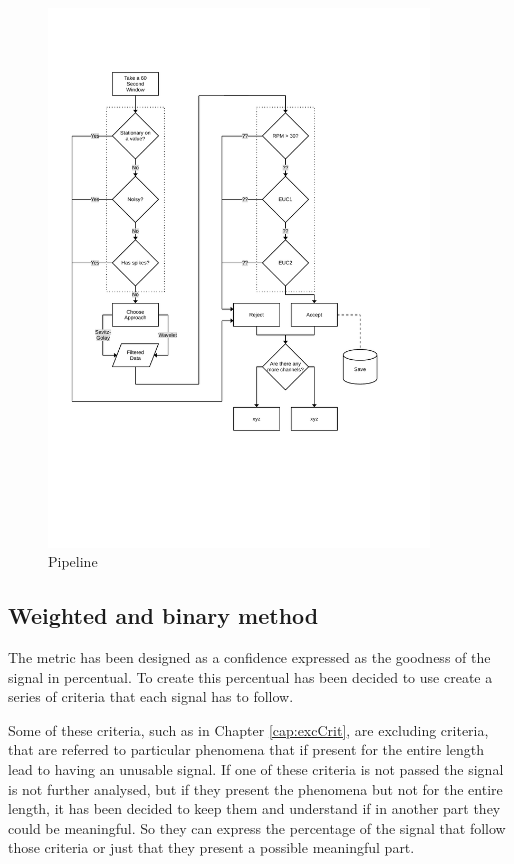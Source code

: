 \begin{figure}[p]
    \centering
    \includegraphics[width=0.9\textwidth]{img/pipeline.pdf}
    \caption{Pipeline}
    \label{fig:pipeline}
\end{figure}

\subsection{Weighted and binary method}
The metric has been designed as a confidence expressed as the goodness of the signal in percentual. To create this percentual has been decided to use create a series of criteria that each signal has to follow. 

Some of these criteria, such as in Chapter \ref{cap:excCrit}, are excluding criteria, that are referred to particular phenomena that if present for the entire length lead to having an unusable signal.
If one of these criteria is not passed the signal is not further analysed, but if they present the phenomena but not for the entire length, it has been decided to keep them and understand if in another part they could be meaningful. So they can express the percentage of the signal that follow those criteria or just that they present a possible meaningful part. 

